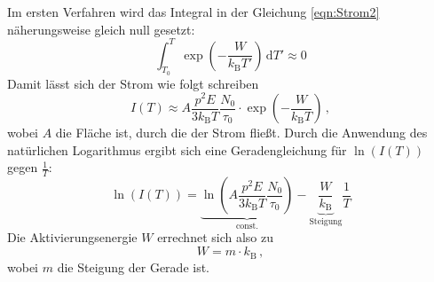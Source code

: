         \noindent Im ersten Verfahren wird das Integral in der Gleichung \eqref{eqn:Strom2} näherungsweise gleich null gesetzt:
        \begin{equation*}
            \int_{T_0}^{T} \exp\left(- \frac{W}{k_\text{B} T'}\right)\,\text{d}T' \approx 0
        \end{equation*}
        Damit lässt sich der Strom wie folgt schreiben
        \begin{equation*}
            I(T) \approx A\frac{p^2E}{3 k_\text{B} T} \frac{N_0}{ \tau_0} \cdot  \exp\left(- \frac{W}{k_\text{B} T}\right) \,,
        \end{equation*}
        wobei $A$ die Fläche ist, durch die der Strom fließt. 
        Durch die Anwendung des natürlichen Logarithmus ergibt sich eine Geradengleichung für $\ln\left(I(T)\right)$ gegen $\frac{1}{T}$:
        \begin{equation}
            \ln\left(I(T)\right) = \underbrace{\ln\left(A \frac{p^2E}{3 k_\text{B} T} \frac{N_0}{\tau_0}\right)}_{\text{const.}} - \underbrace{\frac{W}{k_\text{B}}}_{\text{Steigung}} \frac{1}{T}
            \label{eqn:geradengleichung}
        \end{equation}
        Die Aktivierungsenergie $W$ errechnet sich also zu 
        \begin{equation}
            W = m \cdot k_\text{B} \, ,
            \label{eqn:Aktivierungsenergie}
        \end{equation}
        wobei $m$ die Steigung der Gerade ist. \\

